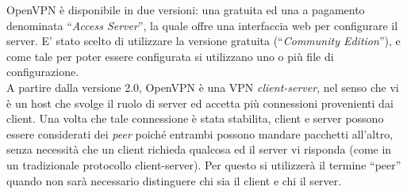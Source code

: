 OpenVPN è disponibile in due versioni: una gratuita ed una a pagamento denominata
``\textit{Access Server}'', la quale offre una interfaccia web per configurare il server.
E' stato scelto di utilizzare la versione gratuita (``\textit{Community Edition}''),
e come tale per poter essere configurata si utilizzano uno o più file di configurazione.\\
A partire dalla versione 2.0, OpenVPN è una VPN \textit{client-server}, nel senso che
vi è un host che svolge il ruolo di server ed accetta più connessioni provenienti
dai client. Una volta che tale connessione è stata stabilita, client e server
possono essere considerati dei \textit{peer} poiché entrambi possono mandare pacchetti
all'altro, senza necessità che un client richieda qualcosa ed il server vi risponda
(come in un tradizionale protocollo client-server). Per questo si utilizzerà
il termine ``peer'' quando non sarà necessario distinguere chi sia il client e chi
il server.



